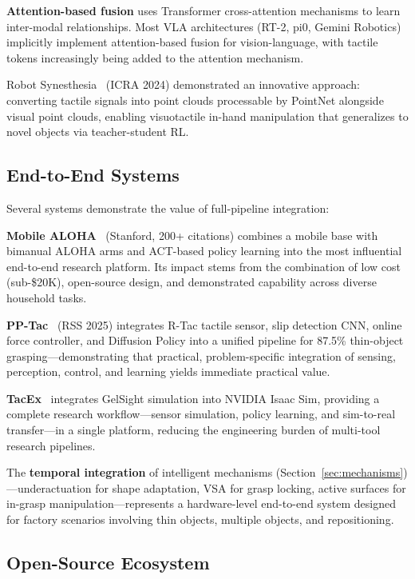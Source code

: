 \textbf{Attention-based fusion} uses Transformer cross-attention mechanisms to learn inter-modal relationships. Most VLA architectures (RT-2, pi0, Gemini Robotics) implicitly implement attention-based fusion for vision-language, with tactile tokens increasingly being added to the attention mechanism.

Robot Synesthesia~\cite{yuan2024synesthesia} (ICRA 2024) demonstrated an innovative approach: converting tactile signals into point clouds processable by PointNet alongside visual point clouds, enabling visuotactile in-hand manipulation that generalizes to novel objects via teacher-student RL.

\subsection{End-to-End Systems}

Several systems demonstrate the value of full-pipeline integration:

\textbf{Mobile ALOHA}~\cite{fu2024mobilealoha} (Stanford, 200+ citations) combines a mobile base with bimanual ALOHA arms and ACT-based policy learning into the most influential end-to-end research platform. Its impact stems from the combination of low cost (sub-\$20K), open-source design, and demonstrated capability across diverse household tasks.

\textbf{PP-Tac}~\cite{lin2025pptac} (RSS 2025) integrates R-Tac tactile sensor, slip detection CNN, online force controller, and Diffusion Policy into a unified pipeline for 87.5\% thin-object grasping---demonstrating that practical, problem-specific integration of sensing, perception, control, and learning yields immediate practical value.

\textbf{TacEx}~\cite{various2024tacex} integrates GelSight simulation into NVIDIA Isaac Sim, providing a complete research workflow---sensor simulation, policy learning, and sim-to-real transfer---in a single platform, reducing the engineering burden of multi-tool research pipelines.

The \textbf{temporal integration} of intelligent mechanisms (Section~\ref{sec:mechanisms})---underactuation for shape adaptation, VSA for grasp locking, active surfaces for in-grasp manipulation---represents a hardware-level end-to-end system designed for factory scenarios involving thin objects, multiple objects, and repositioning.

\subsection{Open-Source Ecosystem}

